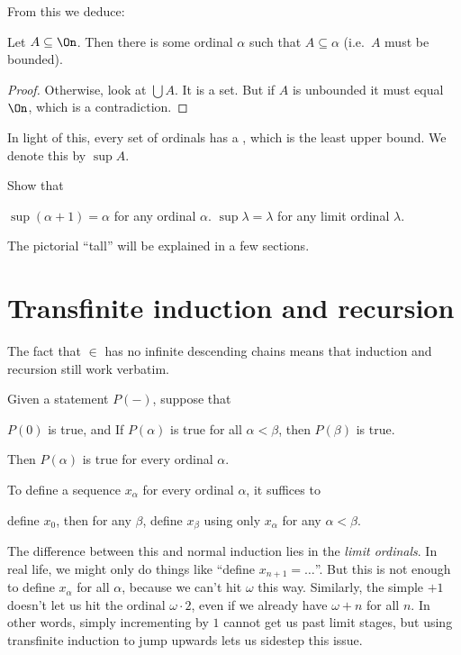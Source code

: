 From this we deduce:
\begin{theorem}
	Let $A \subseteq \On$.
	Then there is some ordinal $\alpha$ such that $A \subseteq \alpha$
	(i.e.\ $A$ must be bounded).
\end{theorem}
\begin{proof}
	Otherwise, look at $\bigcup A$.
	It is a set.
	But if $A$ is unbounded it must equal $\On$,
	which is a contradiction.
\end{proof}
In light of this, every set of ordinals has a ,
which is the least upper bound. We denote this by $\sup A$.

\begin{ques}
	Show that
	\begin{enumerate}[(a)]
		\ii $\sup (\alpha+1) = \alpha$ for any ordinal $\alpha$.
		\ii $\sup \lambda = \lambda$ for any limit ordinal $\lambda$.
	\end{enumerate}
\end{ques}

The pictorial ``tall'' will be explained in a few sections.

\section{Transfinite induction and recursion}
The fact that $\in$ has no infinite descending chains means that induction and recursion still work verbatim.
\begin{theorem}
	Given a statement $P(-)$, suppose that
	\begin{itemize}
		\ii $P(0)$ is true, and
		\ii If $P(\alpha)$ is true for all $\alpha < \beta$, then $P(\beta)$ is true.
	\end{itemize}
	Then $P(\alpha)$ is true for every ordinal $\alpha$.
\end{theorem}
\begin{theorem}
	To define a sequence $x_\alpha$ for every ordinal $\alpha$,
	it suffices to
	\begin{itemize}
		\ii define $x_0$, then
		\ii for any $\beta$, define $x_\beta$ using only $x_\alpha$ for any $\alpha < \beta$.
	\end{itemize}
\end{theorem}

The difference between this and normal induction lies in the \emph{limit ordinals}.
In real life, we might only do things like ``define $x_{n+1} = \dots$''.
But this is not enough to define $x_\alpha$ for all $\alpha$,
because we can't hit $\omega$ this way.
Similarly, the simple $+1$ doesn't let us hit the ordinal $\omega \cdot 2$,
even if we already have $\omega+n$ for all $n$.
In other words, simply incrementing by $1$ cannot get us past limit stages,
but using transfinite induction to jump upwards lets us sidestep this issue.

